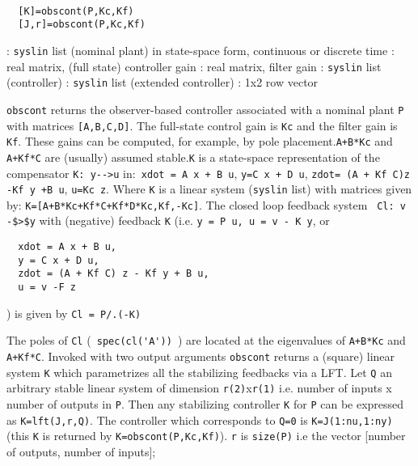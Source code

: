 \begin{mandesc}
   \\ %
\end{mandesc}
\begin{calling_sequence}
\begin{verbatim}
  [K]=obscont(P,Kc,Kf)  
  [J,r]=obscont(P,Kc,Kf)  
\end{verbatim}
\end{calling_sequence}
\begin{parameters}
  \begin{varlist}
    : \verb!syslin! list (nominal plant) in state-space form,
    continuous or discrete time
    : real matrix, (full state) controller gain
    : real matrix, filter gain
    : \verb!syslin! list (controller)
    : \verb!syslin! list (extended controller)
    : 1x2 row vector
  \end{varlist}
\end{parameters}
\begin{mandescription}
  \verb!obscont! returns the observer-based controller associated with a
  nominal plant \verb!P! with matrices \verb![A,B,C,D]!.
  The full-state control gain is \verb!Kc! and the filter gain is \verb!Kf!.
  These gains can be computed, for example, by pole placement.\verb!A+B*Kc! and
  \verb!A+Kf*C! are (usually) assumed stable.\verb!K! is a state-space
  representation of the compensator \verb!K: y-->u!
  in:\verb! xdot = A x + B u!, \verb!y=C x + D u!, \verb!zdot= (A + Kf C)z -Kf y +B u!, \verb!u=Kc z!. 
  Where \verb!K! is a linear system (\verb!syslin! list) with matrices given by:
  \verb!K=[A+B*Kc+Kf*C+Kf*D*Kc,Kf,-Kc]!.  The closed loop feedback system
  \verb! Cl: v -$>$y! with (negative) feedback \verb!K! (i.e.
  \verb!y = P u, u = v - K y!, or
\begin{verbatim}
  xdot = A x + B u, 
  y = C x + D u, 
  zdot = (A + Kf C) z - Kf y + B u, 
  u = v -F z
\end{verbatim}
) is given by \verb!Cl = P/.(-K)!

The poles of \verb!Cl! (\verb! spec(cl('A')) !) are located at the eigenvalues
of \verb!A+B*Kc!  and \verb!A+Kf*C!.  Invoked with two output arguments
\verb!obscont! returns a (square) linear system \verb!K! which parametrizes all
the stabilizing feedbacks via a LFT.  Let \verb!Q! an arbitrary stable linear
system of dimension \verb!r(2)!x\verb!r(1)!  i.e. number of inputs x number of
outputs in \verb!P!.  Then any stabilizing controller \verb!K! for \verb!P! can
be expressed as \verb!K=lft(J,r,Q)!. The controller which corresponds to
\verb!Q=0! is \verb!K=J(1:nu,1:ny)! (this \verb!K! is returned by
\verb!K=obscont(P,Kc,Kf)!).  \verb!r! is \verb!size(P)! i.e the vector [number
of outputs, number of inputs];
\end{mandescription}
